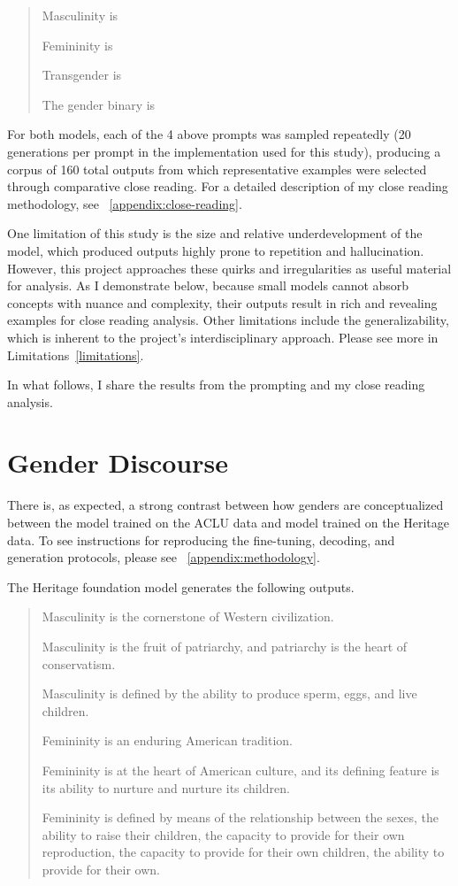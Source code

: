 \documentclass[anonymous,review]{acmart}
\begin{document}
\begin{quote}
Masculinity is

Femininity is

Transgender is

The gender binary is
\end{quote}

For both models, each of the 4 above prompts was sampled repeatedly (20 generations per prompt in the implementation used for this study), producing a corpus of 160 total outputs from which representative examples were selected through comparative close reading. For a detailed description of my close reading methodology, see ~\autoref{appendix:close-reading}.

One limitation of this study is the size and relative underdevelopment of the model, which produced outputs highly prone to repetition and hallucination. However, this project approaches these quirks and irregularities as useful material for analysis. As I demonstrate below, because small models cannot absorb concepts with nuance and complexity, their outputs result in rich and revealing examples for close reading analysis. Other limitations include the generalizability, which is inherent to the project's interdisciplinary approach. Please see more in  Limitations~\autoref{limitations}.

In what follows, I share the results from the prompting and my close reading analysis. 

\section{Gender Discourse}

There is, as expected, a strong contrast between how genders are conceptualized between the model trained on the ACLU data and model trained on the Heritage data. To see instructions for reproducing the fine-tuning, decoding, and generation protocols, please see ~\autoref{appendix:methodology}.

The Heritage foundation model generates the following outputs. 

\begin{quote}
Masculinity is the cornerstone of Western civilization.

Masculinity is the fruit of patriarchy, and patriarchy is the heart
of conservatism.

Masculinity is defined by the ability to produce sperm, eggs, and live
children.

Femininity is an enduring American tradition.

Femininity is at the heart of American culture, and its defining feature is its ability to nurture and nurture its children.

Femininity is defined by means of the relationship between the sexes,
the ability to raise their children, the capacity to provide for their
own reproduction, the capacity to provide for their own children, the
ability to provide for their own.
\end{quote}
\end{document}
